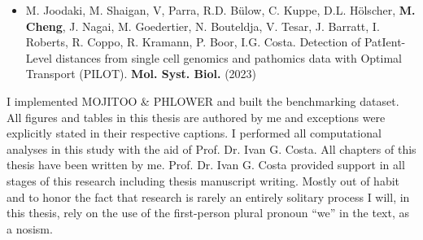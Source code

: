 \begin{addmargin}{0.02\textwidth}
	\begin{itemize}
	\item M. Joodaki, M. Shaigan, V, Parra, R.D. Bülow, C. Kuppe, D.L. Hölscher, \textbf{M. Cheng}, J. Nagai, M. Goedertier, N. Bouteldja, V. Tesar, J. Barratt, I. Roberts, R. Coppo, R. Kramann, P. Boor, I.G. Costa. Detection of PatIent-Level distances from single cell genomics and pathomics data with Optimal Transport (PILOT). \textbf{Mol. Syst. Biol.} (2023)
	\end{itemize}
\end{addmargin}


I implemented MOJITOO \& PHLOWER and built the benchmarking dataset. All figures and tables in this thesis are authored by me and exceptions were explicitly stated in their respective captions. I performed all computational analyses in this study with the aid of Prof. Dr. Ivan G. Costa. All chapters of this thesis have been written by me. Prof. Dr. Ivan G. Costa provided support in all stages of this research including thesis manuscript writing. Mostly out of habit and to honor the fact that research is rarely an entirely solitary process I will, in this thesis, rely on the use of the first-person plural pronoun ``we'' in the text, as a nosism.
